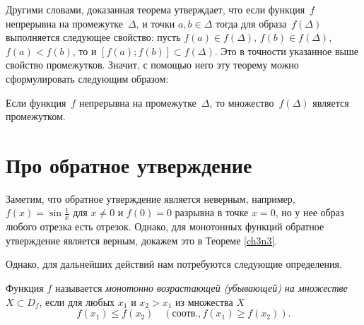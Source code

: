 Другими словами, доказанная теорема утверждает, что если функция~$f$ непрерывна на промежутке~$\Delta$, и точки $a,b\in \Delta$ тогда для образа~$f(\Delta)$ выполняется следующее свойство: пусть $f(a)\in f(\Delta)$, $f(b)\in f(\Delta)$, $f(a)<f(b)$, то и $[f(a);f(b)]\subset f(\Delta)$. Это в точности указанное выше свойство промежутков. Значит, с помощью него эту теорему можно сформулировать следующим образом:	
\begin{thmn}
Если функция~$f$ непрерывна на промежутке~$\Delta$, то множество~$f(\Delta)$ является промежутком.
\end{thmn}

\section{Про обратное утверждение}
Заметим, что обратное утверждение является неверным, например, $f(x)= \sin\frac{1}{x}$ для $x\ne0$ и $f(0) = 0$ разрывна в точке $x = 0$, но у нее образ любого отрезка есть отрезок. Однако, для монотонных функций обратное утверждение является верным, докажем это в Теореме \ref{ch3n3}.

Однако, для дальнейших действий нам потребуются следующие определения.
\begin{defn}
Функция $f$ называется \textit{монотонно возрастающей \textup{(}убывающей) на множестве} $X \subset D_f$, если для любых $x_1$ и $x_2>x_1$ из множества $X$ 
$$
f(x_1)\le f(x_2) \quad (\text{соотв.}, f(x_1)\ge f(x_2)).
$$  
\end{defn}

